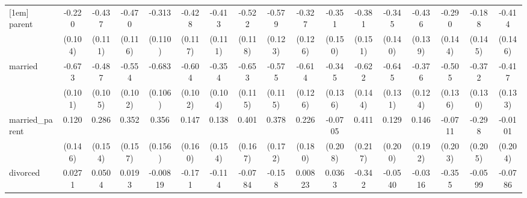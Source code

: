 {\begin{tabular}{l*{16}{c}}
[1em]
parent              &      -0.220\sym{*}  &      -0.437\sym{***}&      -0.470\sym{***}&      -0.313\sym{**} &      -0.428\sym{***}&      -0.413\sym{***}&      -0.522\sym{***}&      -0.579\sym{***}&      -0.327\sym{**} &      -0.351\sym{*}  &      -0.381\sym{*}  &      -0.345\sym{*}  &      -0.436\sym{**} &      -0.290\sym{*}  &      -0.188         &      -0.414\sym{**} \\
                    &     (0.104)         &     (0.111)         &     (0.116)         &     (0.110)         &     (0.117)         &     (0.111)         &     (0.118)         &     (0.123)         &     (0.126)         &     (0.150)         &     (0.151)         &     (0.140)         &     (0.139)         &     (0.144)         &     (0.145)         &     (0.146)         \\
[1em]
married             &      -0.673\sym{***}&      -0.487\sym{***}&      -0.554\sym{***}&      -0.683\sym{***}&      -0.604\sym{***}&      -0.354\sym{***}&      -0.653\sym{***}&      -0.575\sym{***}&      -0.614\sym{***}&      -0.345\sym{*}  &      -0.622\sym{***}&      -0.645\sym{***}&      -0.376\sym{**} &      -0.505\sym{***}&      -0.372\sym{**} &      -0.417\sym{**} \\
                    &     (0.101)         &     (0.105)         &     (0.102)         &     (0.106)         &     (0.102)         &     (0.104)         &     (0.115)         &     (0.115)         &     (0.126)         &     (0.136)         &     (0.144)         &     (0.131)         &     (0.124)         &     (0.136)         &     (0.130)         &     (0.133)         \\
[1em]
married\_parent      &       0.120         &       0.286         &       0.352\sym{*}  &       0.356\sym{*}  &       0.147         &       0.138         &       0.401\sym{*}  &       0.378\sym{*}  &       0.226         &     -0.0705         &       0.411         &       0.129         &       0.146         &     -0.0711         &      -0.298         &     -0.0101         \\
                    &     (0.146)         &     (0.154)         &     (0.157)         &     (0.156)         &     (0.160)         &     (0.154)         &     (0.167)         &     (0.172)         &     (0.180)         &     (0.208)         &     (0.217)         &     (0.200)         &     (0.192)         &     (0.203)         &     (0.205)         &     (0.204)         \\
[1em]
divorced            &      0.0271         &      0.0504         &      0.0193         &    -0.00819         &      -0.171         &      -0.114         &     -0.0784         &      -0.158         &     0.00823         &      0.0363         &      -0.342         &     -0.0540         &     -0.0316         &      -0.355\sym{*}  &     -0.0599         &     -0.0786         \\

\end{tabular}}
